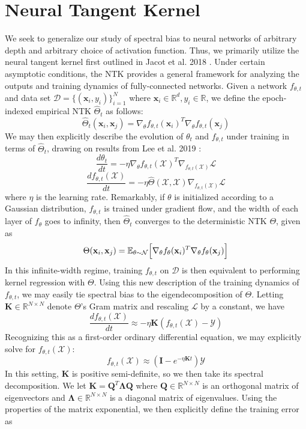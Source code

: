 \documentclass[11pt]{article}
\newcommand{\E}{\mathbb{E}}
\newcommand{\R}{\mathbb{R}}
\newcommand{\X}{\mathcal{X}}
\newcommand{\Y}{\mathcal{Y}}
\begin{document}
\section{Neural Tangent Kernel}
We seek to generalize our study of spectral bias to neural networks of arbitrary depth and arbitrary choice of activation function. Thus, we primarily utilize the neural tangent kernel first outlined in Jacot et al. 2018 \cite{NTK}. Under certain asymptotic conditions, the NTK provides a general framework for analyzing the outputs and training dynamics of fully-connected networks. Given a network $f_{\theta, t}$ and data set $\mathcal{D} = \{(\mathbf{x}_i, y_i)\}_{i = 1}^N$ where $\mathbf{x}_i \in \R^d, y_i \in \R$, we define the epoch-indexed empirical NTK  $\hat{\Theta}_t$ as follows:
$$\hat{\Theta}_t(\mathbf{x}_i, \mathbf{x}_j) = \nabla_\theta f_{\theta, t}(\mathbf{x}_i)^T \nabla_\theta f_{\theta, t}(\mathbf{x}_j)$$
We may then explicitly describe the evolution of $\theta_t$ and $f_{\theta, t}$ under training in terms of $\hat{\Theta}_t$, drawing on results from Lee et al. 2019 \cite{Lee}:
$$\frac{d\theta_t}{dt} = -\eta \nabla_\theta f_{\theta, t}(\X)^T\nabla_{f_{\theta, t}(\X)}\mathcal{L}$$
$$\frac{df_{\theta, t}(\X)}{dt} = -\eta \hat{\Theta}(\X, \X)\nabla_{f_{\theta, t}(\X)}\mathcal{L}$$
where $\eta$ is the learning rate. Remarkably, if $\theta$ is initialized according to a Gaussian distribution, $f_{\theta, t}$ is trained under gradient flow, and the width of each layer of $f_{\theta}$ goes to infinity, then $\hat{\Theta}_t$ converges to the deterministic NTK $\Theta$, given as
$$\Theta(\mathbf{x}_i, \mathbf{x}_j) = \E_{\theta \sim \mathcal{N}}\Bigl[\nabla_\theta f_\theta(\mathbf{x}_i)^T \nabla_\theta f_\theta(\mathbf{x}_j)\Bigr]$$
In this infinite-width regime, training $f_{\theta, t}$ on $\mathcal{D}$ is then equivalent to performing kernel regression with $\Theta$. Using this new description of the training dynamics of $f_{\theta, t}$, we may easily tie spectral bias to the eigendecomposition of $\Theta$. Letting $\mathbf{K} \in \R^{N \times N}$ denote $\Theta$'s Gram matrix and rescaling $\mathcal{L}$ by a constant, we have
$$\frac{df_{\theta, t}(\X)}{dt} \approx - \eta\mathbf{K} (f_{\theta, t}(\X) - \Y)$$
Recognizing this as a first-order ordinary differential equation, we may explicitly solve for $f_{\theta, t}(\X)$:
$$f_{\theta, t}(\X) \approx (\mathbf{I} - e^{-\eta\mathbf{K} t})\Y$$
 In this setting, $\mathbf{K}$ is positive semi-definite, so we then take its spectral decomposition. We let $\mathbf{K} = \mathbf{Q}^T\mathbf{\Lambda Q}$ where $\mathbf{Q} \in \R^{N \times N}$ is an orthogonal matrix of eigenvectors and $\mathbf{\Lambda} \in \R^{N \times N}$ is a diagonal matrix of eigenvalues. Using the properties of the matrix exponential, we then explicitly define the training error as 
\end{document}

